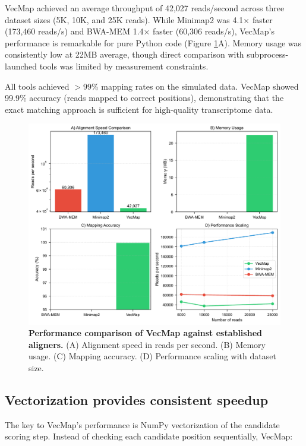\documentclass[12pt]{article}
\begin{document}
VecMap achieved an average throughput of 42,027 reads/second across three dataset sizes (5K, 10K, and 25K reads). While Minimap2 was 4.1× faster (173,460 reads/s) and BWA-MEM 1.4× faster (60,306 reads/s), VecMap's performance is remarkable for pure Python code (Figure \ref{fig:performance}A). Memory usage was consistently low at 22MB average, though direct comparison with subprocess-launched tools was limited by measurement constraints.

All tools achieved $>$99\% mapping rates on the simulated data. VecMap showed 99.9\% accuracy (reads mapped to correct positions), demonstrating that the exact matching approach is sufficient for high-quality transcriptome data.

\begin{figure}[H]
\centering
\includegraphics[width=\textwidth]{docs/figures/figure1_performance_comparison.pdf}
\caption{\textbf{Performance comparison of VecMap against established aligners.} (A) Alignment speed in reads per second. (B) Memory usage. (C) Mapping accuracy. (D) Performance scaling with dataset size.}
\label{fig:performance}
\end{figure}

\subsection{Vectorization provides consistent speedup}

The key to VecMap's performance is NumPy vectorization of the candidate scoring step. Instead of checking each candidate position sequentially, VecMap:
\end{document}
